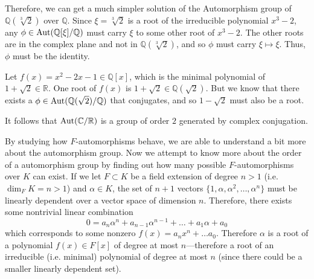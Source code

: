   \begin{example}
    Therefore, we can get a much simpler solution of the Automorphism group of $\mathbb{Q}(\sqrt[3]{2})$ over $\mathbb{Q}$. Since $\xi = \sqrt[3]{2}$ is a root of the irreducible polynomial $x^3 - 2$, any $\phi \in \Aut(\mathbb{Q}[\xi]/\mathbb{Q})$ must carry $\xi$ to some other root of $x^3 - 2$. The other roots are in the complex plane and not in $\mathbb{Q}(\sqrt[3]{2})$, and so $\phi$ must carry $\xi \mapsto \xi$. Thus, $\phi$ must be the identity. 
  \end{example}

  \begin{example}
    Let $f(x) = x^2 - 2x - 1 \in \mathbb{Q}[x]$, which is the minimal polynomial of $1 + \sqrt{2} \in \mathbb{R}$. One root of $f(x)$ is $1 + \sqrt{2} \in \mathbb{Q}(\sqrt{2})$. But we know that there exists a $\phi \in \Aut(\mathbb{Q}(\sqrt{2})/\mathbb{Q})$ that conjugates, and so $1 - \sqrt{2}$ must also be a root. 
  \end{example} 

  \begin{example}
    It follows that $\Aut(\mathbb{C}/\mathbb{R})$ is a group of order $2$ generated by complex conjugation. 
  \end{example} 

  By studying how $F$-automorphisms behave, we are able to understand a bit more about the automorphism group. Now we attempt to know more about the order of a automorphism group by finding out how many possible $F$-automorphisms over $K$ can exist. If we let $F \subset K$ be a field extension of degree $n >1$ (i.e. $\dim_F K = n > 1$) and $\alpha \in K$, the set of $n+1$ vectors $\{1, \alpha, \alpha^2, \ldots, \alpha^n\}$ must be linearly dependent over a vector space of dimension $n$. Therefore, there exists some nontrivial linear combination 
  \begin{equation}
    0 = a_n \alpha^n + a_{n-1} \alpha^{n-1} + \ldots + a_1 \alpha + a_0
  \end{equation} 
  which corresponds to some nonzero $f(x) = a_n x^n + \ldots a_0$. Therefore $\alpha$ is a root of a polynomial $f(x) \in F[x]$ of degree at most $n$---therefore a root of an irreducible (i.e. minimal) polynomial of degree at most $n$ (since there could be a smaller linearly dependent set). 

